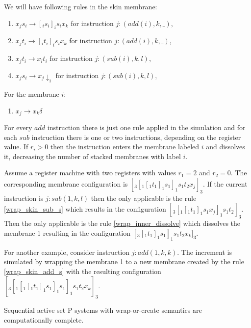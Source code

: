 \documentclass[llncs,submission,copyright,creativecommons]{../lib/lncs/llncs}
\begin{document}
We will have following rules in the skin membrane:
\begin{enumerate}
  \item\label{wrap_skin_add_s} $x_j s_i\rightarrow [_i s_i ]_i s_i x_k$ for instruction $j: (add(i), k, \_)$,
  \item\label{wrap_skin_add_t} $x_j t_i\rightarrow [_i t_i ]_i s_i x_k$ for instruction $j: (add(i), k, \_)$,
  \item\label{wrap_skin_sub_t} $x_j t_i\rightarrow x_l t_i$ for instruction $j: (sub(i), k, l)$,
  \item\label{wrap_skin_sub_s} $x_j s_i\rightarrow x_j\downarrow_i$ for instruction $j: (sub(i), k, l)$,
\end{enumerate}

For the membrane $i$:
\begin{enumerate}[resume]
  \item\label{wrap_inner_dissolve} $x_j \rightarrow x_k\delta$
\end{enumerate}

For every $add$ instruction there is just one rule applied in the simulation and for each $sub$ instruction there is one or two instructions, depending on the register value. If $r_i>0$ then the instruction enters the membrane labeled $i$ and dissolves it, decreasing the number of stacked membranes with label $i$.

\begin{example}
  Assume a register machine with two registers with values $r_1=2$ and $r_2=0$. The corresponding membrane configuration is $[_3 [_1 [_1 t_1 ]_1 s_1 ]_1 s_1 t_2 x_j ]_3$. If the current instruction is $j: sub(1,k,l)$ then the only applicable is the rule \ref{wrap_skin_sub_s} which results in the configuration $[_3 [_1 [_1 t_1 ]_1 s_1 x_j ]_1 s_1 t_2 ]_3$. Then the only applicable is the rule \ref{wrap_inner_dissolve} which dissolves the membrane 1 resulting in the configuration $[_3 [_1 t_1 ]_1 s_1 ]_1 s_1 t_2 x_k ]_3$.

  For another example, consider instruction $j: add(1,k,k)$. The increment is simulated by wrapping the membrane 1 to a new membrane created by the rule \ref{wrap_skin_add_s} with the resulting configuration $[_3 [_1 [_1 [_1 t_1 ]_1 s_1 ]_1 s_1 ]_1 s_1 t_2 x_k ]_3$.
\end{example}

\begin{theorem}
  Sequential active set P systems with wrap-or-create semantics are computationally complete.
\end{theorem}
\end{document}
